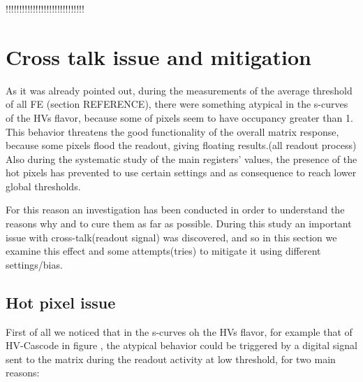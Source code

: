 !!!!!!!!!!!!!!!!!!!!!!!!!!!!!




\section{Cross talk issue and mitigation}

As it was already pointed out, during the measurements of the average threshold of all FE (section REFERENCE), there were something atypical in the s-curves of the HVs flavor, because some of pixels seem to have occupancy greater than 1. This behavior threatens the good functionality of the overall matrix response, because some pixels flood the readout, giving floating results.(all readout process)\\

Also during the systematic study of the main registers' values, the presence of the hot pixels has prevented to use certain settings and as consequence to reach lower global thresholds. 

For this reason an investigation has been conducted in order to understand the reasons why and to cure them as far as possible.
During this study an important issue with cross-talk(readout signal) was discovered, and so in this section we examine this effect and some attempts(tries) to mitigate it using different settings/bias.


\subsection{Hot pixel issue}

First of all we noticed that in the s-curves oh the HVs flavor, for example that of HV-Cascode in figure , the atypical behavior could be triggered by a digital signal sent to the matrix during the readout activity at low threshold, for two main reasons:

